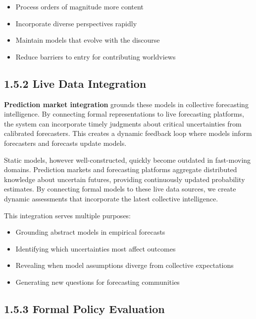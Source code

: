 \documentclass[
  11pt,
  letterpaper,
]{book}
\providecommand{\tightlist}{%
  \setlength{\itemsep}{0pt}\setlength{\parskip}{0pt}}
\begin{document}
\begin{itemize}
\tightlist
\item
  Process orders of magnitude more content
\item
  Incorporate diverse perspectives rapidly
\item
  Maintain models that evolve with the discourse
\item
  Reduce barriers to entry for contributing worldviews
\end{itemize}

\subsection*{1.5.2 Live Data Integration}\label{sec-live-data}

\textbf{Prediction market integration} grounds these models in
collective forecasting intelligence. By connecting formal
representations to live forecasting platforms, the system can
incorporate timely judgments about critical uncertainties from
calibrated forecasters. This creates a dynamic feedback loop where
models inform forecasters and forecasts update models.

Static models, however well-constructed, quickly become outdated in
fast-moving domains. Prediction markets and forecasting platforms
aggregate distributed knowledge about uncertain futures, providing
continuously updated probability estimates. By connecting formal models
to these live data sources, we create dynamic assessments that
incorporate the latest collective intelligence.

This integration serves multiple purposes:

\begin{itemize}
\tightlist
\item
  Grounding abstract models in empirical forecasts
\item
  Identifying which uncertainties most affect outcomes
\item
  Revealing when model assumptions diverge from collective expectations
\item
  Generating new questions for forecasting communities
\end{itemize}

\subsection*{1.5.3 Formal Policy
Evaluation}\label{sec-policy-evaluation}
\end{document}
